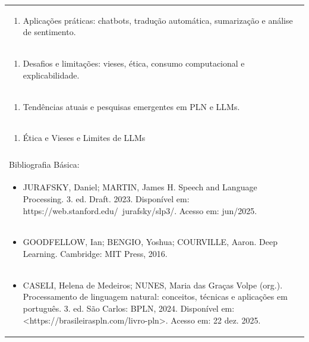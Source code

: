 \documentclass[11pt]{article}
\begin{document}
\begin{center}
\begin{longtable}{|p{4cm}|p{4cm}|p{4cm}|p{4cm}|}
\multicolumn{4}{|p{\dimexpr 16cm + 6\tabcolsep\relax}|}{\begin{enumerate}[start=8]\item Aplicações práticas: chatbots, tradução automática, sumarização e análise de sentimento.\end{enumerate}}\\
\multicolumn{4}{|p{\dimexpr 16cm + 6\tabcolsep\relax}|}{\begin{enumerate}[start=9]\item Desafios e limitações: vieses, ética, consumo computacional e explicabilidade.\end{enumerate}}\\
\multicolumn{4}{|p{\dimexpr 16cm + 6\tabcolsep\relax}|}{\begin{enumerate}[start=10]\item Tendências atuais e pesquisas emergentes em PLN e LLMs.\end{enumerate}}\\
\multicolumn{4}{|p{\dimexpr 16cm + 6\tabcolsep\relax}|}{\begin{enumerate}[start=11]\item Ética e Vieses e Limites de LLMs\end{enumerate}}\\
\multicolumn{4}{|p{\dimexpr 16cm + 6\tabcolsep\relax}|}{}\\
\hline
\multicolumn{4}{|p{16cm}|}{Bibliografia Básica:}\\*
\multicolumn{4}{|p{\dimexpr 16cm + 6\tabcolsep\relax}|}{\begin{itemize}\item JURAFSKY, Daniel; MARTIN, James H. Speech and Language Processing. 3. ed. Draft. 2023. Disponível em: https://web.stanford.edu/~jurafsky/slp3/. Acesso em: jun/2025.\end{itemize}}\\
\multicolumn{4}{|p{\dimexpr 16cm + 6\tabcolsep\relax}|}{\begin{itemize}\item GOODFELLOW, Ian; BENGIO, Yoshua; COURVILLE, Aaron. Deep Learning. Cambridge: MIT Press, 2016.\end{itemize}}\\
\multicolumn{4}{|p{\dimexpr 16cm + 6\tabcolsep\relax}|}{\begin{itemize}\item CASELI, Helena de Medeiros; NUNES, Maria das Graças Volpe (org.). Processamento de linguagem natural: conceitos, técnicas e aplicações em português. 3. ed. São Carlos: BPLN, 2024. Disponível em: <https://brasileiraspln.com/livro-pln>. Acesso em: 22 dez. 2025.\end{itemize}}\\

\end{longtable}
\end{center}
\end{document}
